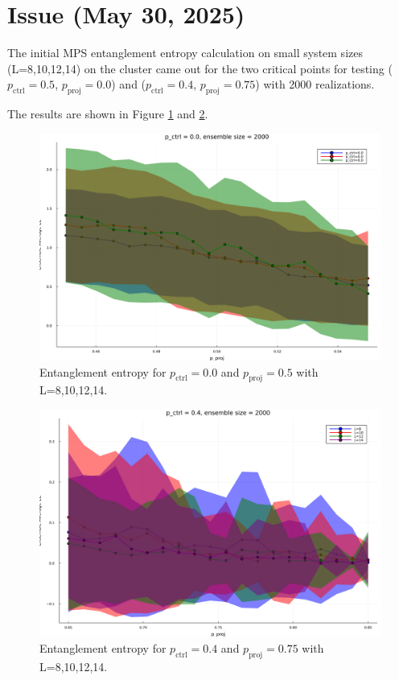 \documentclass[11pt,a4paper]{article}
\begin{document}
\section{Issue (May 30, 2025)}

The initial MPS entanglement entropy calculation on small system sizes (L=8,10,12,14) on the cluster came out for the two critical points for testing ($p_\text{ctrl}=0.5$, $p_\text{proj}=0.0$) and ($p_\text{ctrl}=0.4$, $p_\text{proj}=0.75$) with 2000 realizations.

The results are shown in Figure \ref{fig:pctrl0.0pproj0.5(1)} and \ref{fig:pctrl0.4pproj0.7(1)}.

\begin{figure}[H]
    \centering
    \includegraphics[width=0.8\linewidth]{p_ctrl0.0p_proj0.5(1).png}
    \caption{Entanglement entropy for $p_\text{ctrl}=0.0$ and $p_\text{proj}=0.5$ with L=8,10,12,14.}
    \label{fig:pctrl0.0pproj0.5(1)}
\end{figure}

\begin{figure}[H]
    \centering
    \includegraphics[width=0.8\linewidth]{p_ctrl0.4p_proj0.7(1).png}
    \caption{Entanglement entropy for $p_\text{ctrl}=0.4$ and $p_\text{proj}=0.75$ with L=8,10,12,14.}
    \label{fig:pctrl0.4pproj0.7(1)}
\end{figure}
\end{document}
